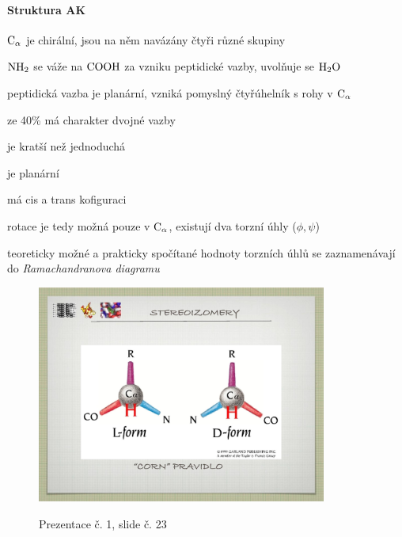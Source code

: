 \documentclass[DIV=8]{scrreprt}
\begin{document}
\paragraph{Struktura AK}
\begin{myItemize}[nosep]
    \item \(\ce{C_\alpha}\) je chirální, jsou na něm navázány čtyři různé skupiny
    \item \(\ce{NH2}\) se váže na \(\ce{COOH}\) za vzniku peptidické vazby, uvolňuje se \(\ce{H2O}\)
\begin{myItemize}[nosep]
    \item peptidická vazba je planární, vzniká pomyslný čtyřúhelník s rohy v \(\ce{C_\alpha}\)
    \item ze 40\% má charakter dvojné vazby
\begin{myItemize}[nosep]
    \item je kratší než jednoduchá
    \item je planární
    \item má cis a trans kofiguraci
\end{myItemize}

    \item rotace je tedy možná pouze v \(\ce{C_\alpha}\), existují dva torzní úhly (\(\phi, \psi\))
\begin{myItemize}[nosep]
    \item teoreticky možné a prakticky spočítané hodnoty torzních úhlů se zaznamenávají do \emph{Ramachandranova diagramu}
\end{myItemize}

\end{myItemize}

\end{myItemize}



\begin{figure}
    \caption{Prezentace č. 1, slide č. 23}
    \includegraphics[width=0.85\textwidth]{slides-1/slide-23.jpg}
    \centering
    \label{slides-1-slide-23}
\end{figure}
\end{document}
